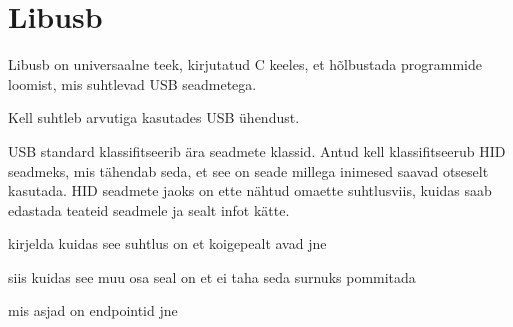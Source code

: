 
\section{Libusb}\label{sec:libusb}
Libusb on universaalne teek, kirjutatud C keeles, et hõlbustada programmide loomist, mis suhtlevad USB seadmetega.

Kell suhtleb arvutiga kasutades USB ühendust.

USB standard klassifitseerib ära seadmete klassid. Antud kell klassifitseerub HID seadmeks, mis tähendab seda, et see on seade millega inimesed saavad otseselt kasutada.
HID seadmete jaoks on ette nähtud omaette suhtlusviis, kuidas saab edastada teateid seadmele ja sealt infot kätte.

kirjelda kuidas see suhtlus on et koigepealt avad jne 

siis kuidas see muu osa seal on et ei taha seda surnuks pommitada

mis asjad on endpointid jne

